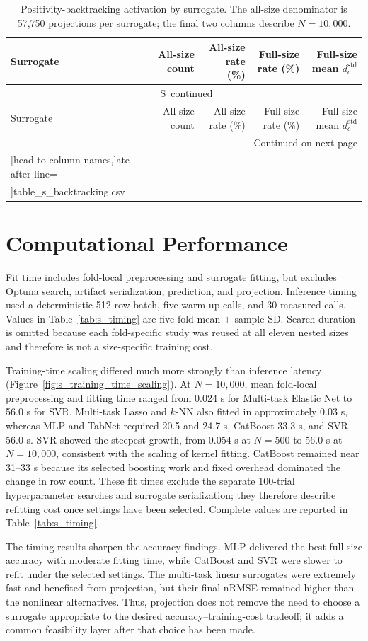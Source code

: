 \documentclass[a4paper,10pt]{article}
\newcommand{\csvrowsfive}[1]{%
  \csvreader[head to column names,late after line=\\]{#1}{}{\colA & \colB & \colC & \colD & \colE}}
\newcommand{\csvlongtable}[7]{%
  \begin{longtable}{#1}
  \caption{#2}\label{#3}\\
  \toprule
  #5 \\
  \midrule
  \endfirsthead
  \multicolumn{#4}{c}{\tablename\ \thetable\ continued}\\
  \toprule
  #5 \\
  \midrule
  \endhead
  \midrule\multicolumn{#4}{r}{Continued on next page}\\
  \endfoot
  \bottomrule
  \endlastfoot
  #7{#6}
  \end{longtable}%
}
\renewcommand{\thetable}{S\arabic{table}}
\begin{document}
\begingroup
\small
\setlength{\tabcolsep}{4pt}
\csvlongtable
  {lrrrr}
  {Positivity-backtracking activation by surrogate. The all-size denominator is 57,750 projections per surrogate; the final two columns describe $N=10{,}000$.}
  {tab:s_backtracking}
  {5}
  {Surrogate & All-size count & All-size rate (\%) & Full-size rate (\%) & Full-size mean $d_c^{\mathrm{std}}$}
  {table_s_backtracking.csv}
  {\csvrowsfive}
\endgroup

\section{Computational Performance}

Fit time includes fold-local preprocessing and surrogate fitting, but excludes Optuna search, artifact serialization, prediction, and projection. Inference timing used a deterministic 512-row batch, five warm-up calls, and 30 measured calls. Values in Table~\ref{tab:s_timing} are five-fold mean $\pm$ sample SD. Search duration is omitted because each fold-specific study was reused at all eleven nested sizes and therefore is not a size-specific training cost.

Training-time scaling differed much more strongly than inference latency (Figure~\ref{fig:s_training_time_scaling}). At $N=10{,}000$, mean fold-local preprocessing and fitting time ranged from 0.024 s for Multi-task Elastic Net to 56.0 s for SVR. Multi-task Lasso and $k$-NN also fitted in approximately 0.03 s, whereas MLP and TabNet required 20.5 and 24.7 s, CatBoost 33.3 s, and SVR 56.0 s. SVR showed the steepest growth, from 0.054 s at $N=500$ to 56.0 s at $N=10{,}000$, consistent with the scaling of kernel fitting. CatBoost remained near 31--33 s because its selected boosting work and fixed overhead dominated the change in row count. These fit times exclude the separate 100-trial hyperparameter searches and surrogate serialization; they therefore describe refitting cost once settings have been selected. Complete values are reported in Table~\ref{tab:s_timing}.

The timing results sharpen the accuracy findings. MLP delivered the best full-size accuracy with moderate fitting time, while CatBoost and SVR were slower to refit under the selected settings. The multi-task linear surrogates were extremely fast and benefited from projection, but their final nRMSE remained higher than the nonlinear alternatives. Thus, projection does not remove the need to choose a surrogate appropriate to the desired accuracy--training-cost tradeoff; it adds a common feasibility layer after that choice has been made.
\end{document}
